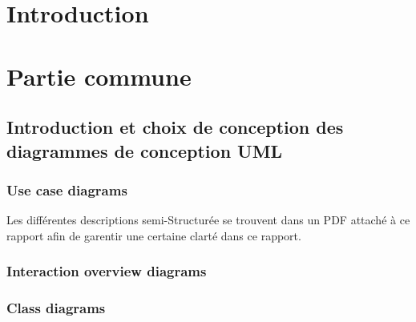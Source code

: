 \documentclass[]{report}
\begin{document}




\newpage

\tableofcontents

\newpage

\chapter{Introduction}

\newpage



\newpage
\chapter{Partie commune}


\newpage




\section{Introduction et choix de conception des diagrammes de conception UML}



\subsection{Use case diagrams}
Les différentes descriptions semi-Structurée se trouvent dans un PDF attaché à ce rapport afin de garentir une certaine clarté dans ce rapport.
\newpage

\subsection{Interaction overview diagrams}



\newpage

\subsection{Class diagrams}
\end{document}

